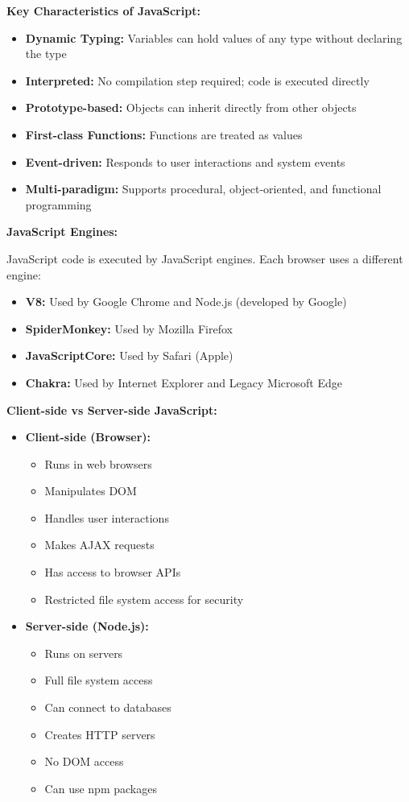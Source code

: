 \documentclass[12pt,a4paper,oneside]{book}
\begin{document}
\textbf{Key Characteristics of JavaScript:}
\begin{itemize}
    \item \textbf{Dynamic Typing:} Variables can hold values of any type without declaring the type
    \item \textbf{Interpreted:} No compilation step required; code is executed directly
    \item \textbf{Prototype-based:} Objects can inherit directly from other objects
    \item \textbf{First-class Functions:} Functions are treated as values
    \item \textbf{Event-driven:} Responds to user interactions and system events
    \item \textbf{Multi-paradigm:} Supports procedural, object-oriented, and functional programming
\end{itemize}

\textbf{JavaScript Engines:}

JavaScript code is executed by JavaScript engines. Each browser uses a different engine:
\begin{itemize}
    \item \textbf{V8:} Used by Google Chrome and Node.js (developed by Google)
    \item \textbf{SpiderMonkey:} Used by Mozilla Firefox
    \item \textbf{JavaScriptCore:} Used by Safari (Apple)
    \item \textbf{Chakra:} Used by Internet Explorer and Legacy Microsoft Edge
\end{itemize}

\textbf{Client-side vs Server-side JavaScript:}

\begin{itemize}
    \item \textbf{Client-side (Browser):} 
    \begin{itemize}
        \item Runs in web browsers
        \item Manipulates DOM
        \item Handles user interactions
        \item Makes AJAX requests
        \item Has access to browser APIs
        \item Restricted file system access for security
    \end{itemize}
    
    \item \textbf{Server-side (Node.js):}
    \begin{itemize}
        \item Runs on servers
        \item Full file system access
        \item Can connect to databases
        \item Creates HTTP servers
        \item No DOM access
        \item Can use npm packages
    \end{itemize}
\end{itemize}
\end{document}
